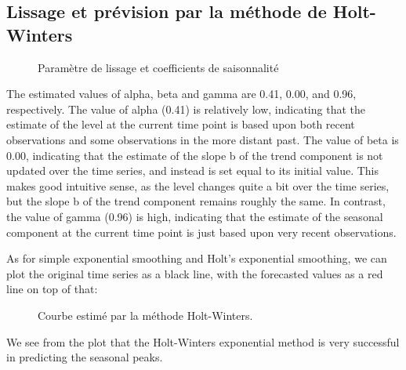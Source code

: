 	\subsection{Lissage et prévision par la méthode de Holt-Winters}
	\begin{figure}[H]
		\centering
		\caption{Paramètre de lissage et coefficients de saisonnalité}
		\label{fig:hw_param}
	\end{figure}
	The estimated values of alpha, beta and gamma are 0.41, 0.00, and 0.96, respectively. The value of alpha (0.41)
is relatively low, indicating that the estimate of the level at the current time point is based upon both recent
observations and some observations in the more distant past. The value of beta is 0.00, indicating that the estimate
of the slope b of the trend component is not updated over the time series, and instead is set equal to its initial value.
This makes good intuitive sense, as the level changes quite a bit over the time series, but the slope b of the trend
component remains roughly the same. In contrast, the value of gamma (0.96) is high, indicating that the estimate
of the seasonal component at the current time point is just based upon very recent observations.
\par
As for simple exponential smoothing and Holt’s exponential smoothing, we can plot the original time series as a
black line, with the forecasted values as a red line on top of that:
	\begin{figure}[H]
		\centering
		\caption{Courbe estimé par la méthode Holt-Winters.}
		\label{fig:hw_for}
	\end{figure}
	We see from the plot that the Holt-Winters exponential method is very successful in predicting the seasonal peaks.
	
